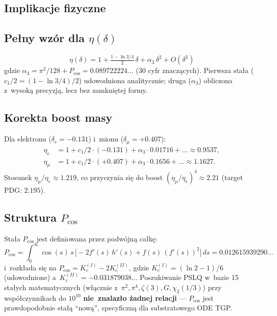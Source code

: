 \subsection{Implikacje fizyczne}
\label{sec:T6-physics}

\subsection*{Pe\l{}ny wz\'or dla $\eta(\delta)$}

\begin{equation}
  \boxed{\;\eta(\delta) = 1 + \tfrac{1-\ln 3/4}{2}\,\delta + \alpha_3\,\delta^2 + O(\delta^3)\;}
\end{equation}
gdzie $\alpha_3 = \pi^2/128 + P_{\cos} = 0.089722224\ldots$ (30 cyfr znacz\k{a}cych).
Pierwsza sta\l{}a ($c_1/2 = (1 - \ln 3/4)/2$) udowodniona analitycznie;
druga ($\alpha_3$) obliczona z~wysok\k{a} precyzj\k{a}, lecz bez zamkni\k{e}tej formy.

\subsection*{Korekta boost masy}

Dla elektronu ($\delta_e = -0.131$) i~mionu ($\delta_\mu = +0.407$):
\begin{align*}
  \eta_e &= 1 + c_1/2 \cdot (-0.131) + \alpha_3 \cdot 0.01716 + \ldots \approx 0.9537, \\
  \eta_\mu &= 1 + c_1/2 \cdot (+0.407) + \alpha_3 \cdot 0.1656 + \ldots \approx 1.1627.
\end{align*}
Stosunek $\eta_\mu/\eta_e \approx 1.219$, co przyczynia si\k{e} do boost
$(\eta_\mu/\eta_e)^4 \approx 2.21$ (target PDG: $2.195$).

\subsection*{Struktura $P_{\cos}$}

Sta\l{}a $P_{\cos}$ jest definiowana przez podw\'ojn\k{a} ca\l{}k\k{e}:
\begin{equation}
  P_{\cos} = \int_0^{\infty} \cos(s)\,s\,\big[-2 f'(s)\,h'(s) + f(s)\,(f'(s))^2\big]\,ds
          = 0.012615939290\ldots
\end{equation}
i~rozk\l{}ada si\k{e} na $P_{\cos} = K_c^{(I)} - 2K_c^{(II)}$, gdzie
$K_c^{(I)} = (\ln 2 - 1)/6$ (udowodnione) a~$K_c^{(II)} = -0.031879038\ldots$
Poszukiwanie PSLQ w~bazie 15 sta\l{}ych matematycznych
(w\l{}\k{a}cznie z~$\pi^2, \pi^4, \zeta(3), G, \chi_2(1/3)$)
przy wsp\'o\l{}czynnikach do $10^{10}$ \textbf{nie~znalaz\l{}o \.zadnej relacji}
--- $P_{\cos}$ jest prawdopodobnie sta\l{}\k{a} ``now\k{a}'', specyficzn\k{a}
dla substratowego ODE TGP.


